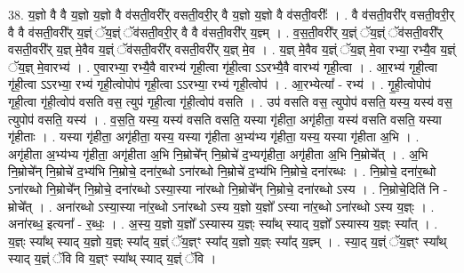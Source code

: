 \documentclass[17pt]{extarticle}
\begin{document}
38. य॒ज्ञो वै वै य॒ज्ञो य॒ज्ञो वै व॑सती॒वरी᳚र् वसती॒वरी॒र् वै य॒ज्ञो य॒ज्ञो वै व॑सती॒वरीः᳚ । . वै व॑सती॒वरी᳚र् वसती॒वरी॒र् वै वै व॑सती॒वरी᳚र् य॒ज्ञ्ं ॅय॒ज्ञ्ं ॅव॑सती॒वरी॒र् वै वै व॑सती॒वरी᳚र् य॒ज्ञ्म् । . व॒स॒ती॒वरी᳚र् य॒ज्ञ्ं ॅय॒ज्ञ्ं ॅव॑सती॒वरी᳚र् वसती॒वरी᳚र् य॒ज्ञ् मे॒वैव य॒ज्ञ्ं ॅव॑सती॒वरी᳚र् वसती॒वरी᳚र् य॒ज्ञ् मे॒व । . य॒ज्ञ् मे॒वैव य॒ज्ञ्ं ॅय॒ज्ञ् मे॒वा रभ्या॒ रभ्यै॒व य॒ज्ञ्ं ॅय॒ज्ञ् मे॒वारभ्य॑ । . ए॒वारभ्या॒ रभ्यै॒वै वारभ्य॑ गृही॒त्वा गृ॑ही॒त्वा ऽऽरभ्यै॒वै वारभ्य॑ गृही॒त्वा । . आ॒रभ्य॑ गृही॒त्वा गृ॑ही॒त्वा ऽऽरभ्या॒ रभ्य॑ गृही॒त्वोपोप॑ गृही॒त्वा ऽऽरभ्या॒ रभ्य॑ गृही॒त्वोप॑ । . आ॒रभ्येत्या᳚ - रभ्य॑ । . गृ॒ही॒त्वोपोप॑ गृही॒त्वा गृ॑ही॒त्वोप॑ वसति वस॒ त्युप॑ गृही॒त्वा गृ॑ही॒त्वोप॑ वसति । . उप॑ वसति वस॒ त्युपोप॑ वसति॒ यस्य॒ यस्य॑ वस॒ त्युपोप॑ वसति॒ यस्य॑ । . व॒स॒ति॒ यस्य॒ यस्य॑ वसति वसति॒ यस्या गृ॑हीता॒ अगृ॑हीता॒ यस्य॑ वसति वसति॒ यस्या गृ॑हीताः । . यस्या गृ॑हीता॒ अगृ॑हीता॒ यस्य॒ यस्या गृ॑हीता अ॒भ्य॑भ्य गृ॑हीता॒ यस्य॒ यस्या गृ॑हीता अ॒भि । . अगृ॑हीता अ॒भ्य॑भ्य गृ॑हीता॒ अगृ॑हीता अ॒भि नि॒म्रोचे᳚न् नि॒म्रोचे॑ द॒भ्यगृ॑हीता॒ अगृ॑हीता अ॒भि नि॒म्रोचे᳚त् । . अ॒भि नि॒म्रोचे᳚न् नि॒म्रोचे॑ द॒भ्य॑भि नि॒म्रोचे॒ दना॑र॒ब्धो ऽना॑रब्धो नि॒म्रोचे॑ द॒भ्य॑भि नि॒म्रोचे॒ दना॑रब्धः । . नि॒म्रोचे॒ दना॑र॒ब्धो ऽना॑रब्धो नि॒म्रोचे᳚न् नि॒म्रोचे॒ दना॑रब्धो ऽस्या॒स्या ना॑रब्धो नि॒म्रोचे᳚न् नि॒म्रोचे॒ दना॑रब्धो ऽस्य । . नि॒म्रोचे॒दिति॑ नि - म्रोचे᳚त् । . अना॑रब्धो ऽस्या॒स्या ना॑र॒ब्धो ऽना॑रब्धो ऽस्य य॒ज्ञो य॒ज्ञो᳚ ऽस्या ना॑र॒ब्धो ऽना॑रब्धो ऽस्य य॒ज्ञ्ः । . अना॑रब्ध॒ इत्यना᳚ - र॒ब्धः॒ । . अ॒स्य॒ य॒ज्ञो य॒ज्ञो᳚ ऽस्यास्य य॒ज्ञ्ः स्या᳚थ् स्याद् य॒ज्ञो᳚ ऽस्यास्य य॒ज्ञ्ः स्या᳚त् । . य॒ज्ञ्ः स्या᳚थ् स्याद् य॒ज्ञो य॒ज्ञ्ः स्या᳚द् य॒ज्ञ्ं ॅय॒ज्ञ्ꣳ स्या᳚द् य॒ज्ञो य॒ज्ञ्ः स्या᳚द् य॒ज्ञ्म् । . स्या॒द् य॒ज्ञ्ं ॅय॒ज्ञ्ꣳ स्या᳚थ् स्याद् य॒ज्ञ्ं ॅवि वि य॒ज्ञ्ꣳ स्या᳚थ् स्याद् य॒ज्ञ्ं ॅवि । \newline
\pagebreak
{}
\end{document}
